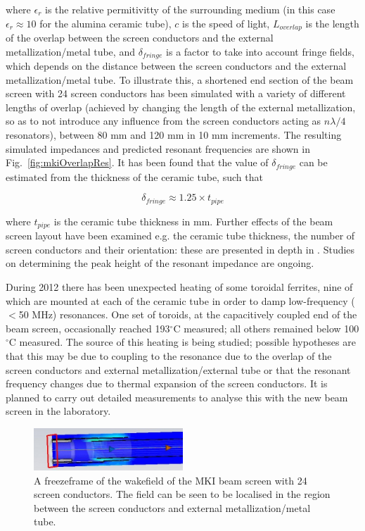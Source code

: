 \documentclass{JAC2003}
\begin{document}
where $\epsilon_{r}$ is the relative permitivitty of the surrounding medium (in this case $\epsilon_{r} \approx 10$ for the alumina ceramic tube), $c$ is the speed of light, $L_{overlap}$ is the length of the overlap between the screen conductors and the external metallization/metal tube, and $\delta_{fringe}$ is a factor to take into account fringe fields, which depends on the distance between the screen conductors and the external metallization/metal tube. To illustrate this, a shortened end section of the beam screen with 24 screen conductors has been simulated with a variety of different lengths of overlap (achieved by changing the length of the external metallization, so as to not introduce any influence from the screen conductors acting as $n \lambda /4$ resonators), between 80 mm and 120 mm in 10 mm increments. The resulting simulated impedances and predicted resonant frequencies are shown in Fig.~\ref{fig:mkiOverlapRes}. It has been found that the value of $\delta_{fringe}$ can be estimated from the thickness of the ceramic tube, such that

\begin{equation}
\delta_{fringe} \approx 1.25 \times t_{pipe}
\end{equation}

where $t_{pipe}$ is the ceramic tube thickness in mm. Further effects of the beam screen layout have been examined e.g. the ceramic tube thickness, the number of screen conductors and their orientation: these are presented in depth in \cite{DayThesis}. Studies on determining the peak height of the resonant impedance are ongoing. 

During 2012 there has been unexpected heating of some toroidal ferrites, nine of which are mounted at each of the ceramic tube in order to damp low-frequency ($<$50 MHz) resonances. One set of toroids, at the capacitively coupled end of the beam screen, occasionally reached 193$^{\circ}$C measured; all others remained below 100$^{\circ}$C measured. The source of this heating is being studied; possible hypotheses are that this may be due to coupling to the resonance due to the overlap of the screen conductors and external metallization/external tube or that the resonant frequency changes due to thermal expansion of the screen conductors. It is planned to carry out detailed measurements to analyse this with the new beam screen in the laboratory.

\begin{figure}
\includegraphics[width=0.5\textwidth]{resField.jpeg}
\caption{A freezeframe of the wakefield of the MKI beam screen with 24 screen conductors. The field can be seen to be localised in the region between the screen conductors and external metallization/metal tube.}
\label{fig:mkiResFieldPat}
\end{figure}
\end{document}
